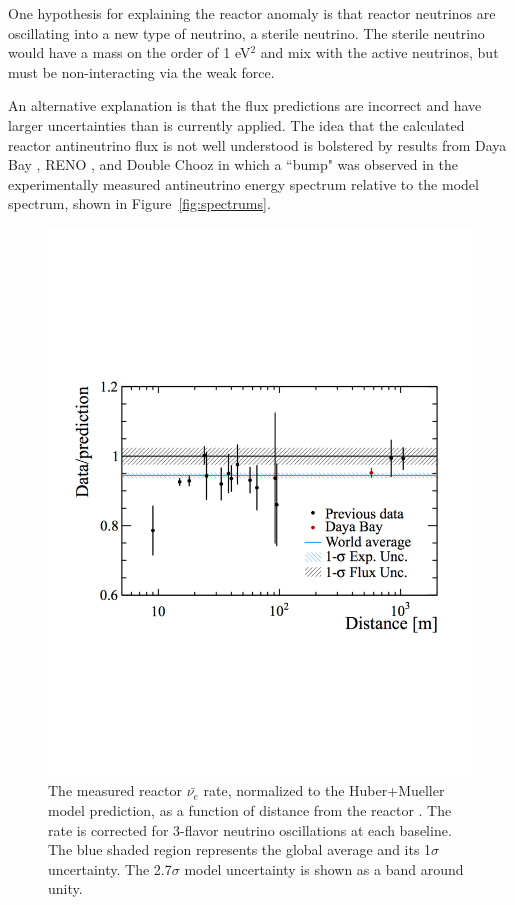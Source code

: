 One hypothesis for explaining the reactor anomaly is that reactor neutrinos are oscillating into a new type of neutrino, a sterile neutrino. The sterile neutrino would have a mass on the order of 1 eV$^2$ and mix with the active neutrinos, but must be non-interacting via the weak force. 


An alternative explanation is that the flux predictions are incorrect and have larger uncertainties than is currently applied. 
The idea that the calculated reactor antineutrino flux is not well understood is bolstered by results from Daya Bay \cite{DayaBayAnomaly}, RENO \cite{Seo:2016uom}, and Double Chooz \cite{DoubleChooz:2019qbj} in which a ``bump" was observed in the experimentally measured antineutrino energy spectrum relative to the model spectrum, shown in Figure~\ref{fig:spectrums}.


\begin{figure}[t]
	\centering
	\includegraphics[width=0.6\linewidth]{tex/3-reactorneutrinos-images/WorldAvgFlux}
	\caption[World average of reactor $\bar{\nu_{e}}$ flux. ]{The measured reactor $\bar{\nu_{e}}$ rate, normalized to the Huber+Mueller model prediction, as a function of distance from the reactor \cite{DayaBayFlux2018}. The rate is corrected for 3-flavor neutrino oscillations at each baseline. The blue shaded region represents the global average and its 1$\sigma$ uncertainty. The 2.7$\sigma$ model uncertainty is shown as a band around unity.}
	\label{fig:worldavgflux}
\end{figure}




